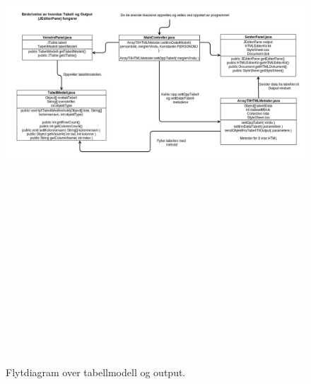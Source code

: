 \begin{figure}[ht]
\begin{center}
 \includegraphics[angle=90 , height=21cm]{./img/appendix/diagram/tabell_og_output.png}
 \caption[Tabellmodell og output]{Flytdiagram over tabellmodell og output.}
 \label{fig:tabell_og_output}
  \end{center}
\end{figure}